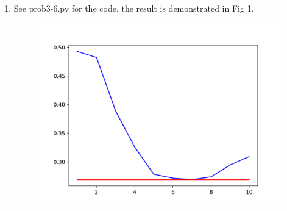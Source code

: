 \documentclass[12pt]{article}
\begin{document}
\begin{enumerate}[label=(\alph*)]
\begin{enumerate}[label=\arabic*.]
    \item
      \begin{quote}
        atchy combination of soap opera , low-tech magic realism and , at times , ploddingly sociological commentary . \\
Truth: -1, Prediction: 1 [WRONG] \\
magic                         1 * 0.54 = 0.54 \\
realism                       1 * 0.42 = 0.42 \\
times                         1 * 0.24 = 0.24 \\
and                           1 * 0.17 = 0.17 \\
at                            1 * 0.08 = 0.08 \\ 
.                             1 * 0.08 = 0.08 \\
,                             3 * 0.02 = 0.06 \\
of                            1 * 0.05 = 0.05 \\ 
sociological                  1 * 0.02 = 0.02 \\
patchy                        1 * 0 = 0 \\
ploddingly                    1 * 0 = 0 \\
low-tech                      1 * 0 = 0 \\
combination                   1 * -0.11 = -0.11 \\
commentary                    1 * -0.2 = -0.2 \\
opera                         1 * -0.3 = -0.3 \\
      \end{quote}
    Analysis: Our predictor haven't encountered "low-tech" before and can't understand relations between "low-tech" and "magic realism".
    \end{enumerate} \qed
    \setcounter{enumi}{5}
    \item 
      See prob3-6.py for the code, the result is demonstrated in Fig 1. \\
      \begin{figure}
          \centering
          \includegraphics{fig3_6.png}

\end{figure}
\end{enumerate}
\end{document}
